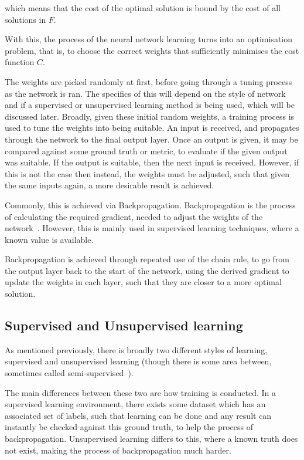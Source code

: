 which means that the cost of the optimal solution is bound by the cost of
all solutions in $F$.

With this, the process of the neural network learning turns into an
optimisation problem, that is, to choose the correct weights that sufficiently
minimises the cost function $C$.

The weights are picked randomly at first, before going through a tuning
process as the network is ran. The specifics of this will depend on
the style of network and if a supervised or unsupervised learning method
is being used, which will be discussed later. Broadly, given these
initial random weights, a training process is used to tune the weights
into being suitable. An input is received, and propagates through the
network to the final output layer. Once an output is given, it may be compared
against some ground truth or metric, to evaluate if the given output was suitable.
If the output is suitable, then the next input is received. However, if this
is not the case then instead, the weights must be adjusted, such that
given the same inputs again, a more desirable result is achieved.

Commonly, this is achieved via Backpropagation. Backpropagation is the process
of calculating the required gradient, needed to adjust the weights of the
network~\cite{goodfellow2016deep}. However, this is mainly used
in supervised learning techniques, where a known value is available.

Backpropagation is achieved through repeated use of the chain rule,
to go from the output layer back to the start of the network,
using the derived gradient to update the weights in each layer,
such that they are closer to a more optimal solution.


\subsection{Supervised and Unsupervised learning}

As mentioned previously, there is broadly two different styles of learning,
supervised and unsupervised learning (though there is some area between,
sometimes called semi-supervised~\cite{chapelle2009semi}).

The main differences between these two are how training is conducted. In a
supervised learning environment, there exists some dataset which has an
associated set of labels, such that learning can be done and any result can
instantly be checked against this ground truth, to help the process of
backpropagation. Unsupervised learning differs to this, where a known truth
does not exist, making the process of backpropagation much harder.


